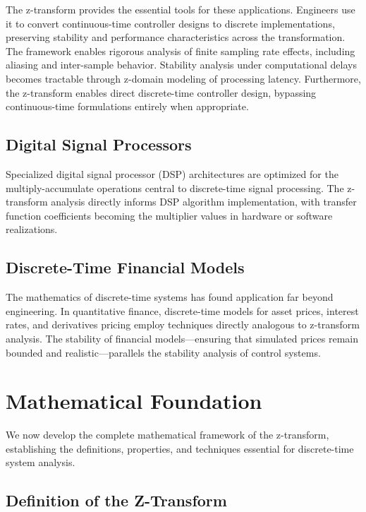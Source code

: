 The z-transform provides the essential tools for these applications. Engineers use it to convert continuous-time controller designs to discrete implementations, preserving stability and performance characteristics across the transformation. The framework enables rigorous analysis of finite sampling rate effects, including aliasing and inter-sample behavior. Stability analysis under computational delays becomes tractable through z-domain modeling of processing latency. Furthermore, the z-transform enables direct discrete-time controller design, bypassing continuous-time formulations entirely when appropriate.

\subsection{Digital Signal Processors}

Specialized digital signal processor (DSP) architectures are optimized for the multiply-accumulate operations central to discrete-time signal processing. The z-transform analysis directly informs DSP algorithm implementation, with transfer function coefficients becoming the multiplier values in hardware or software realizations.

\subsection{Discrete-Time Financial Models}

The mathematics of discrete-time systems has found application far beyond engineering. In quantitative finance, discrete-time models for asset prices, interest rates, and derivatives pricing employ techniques directly analogous to z-transform analysis. The stability of financial models---ensuring that simulated prices remain bounded and realistic---parallels the stability analysis of control systems.

\section{Mathematical Foundation}

We now develop the complete mathematical framework of the z-transform, establishing the definitions, properties, and techniques essential for discrete-time system analysis.

\subsection{Definition of the Z-Transform}

